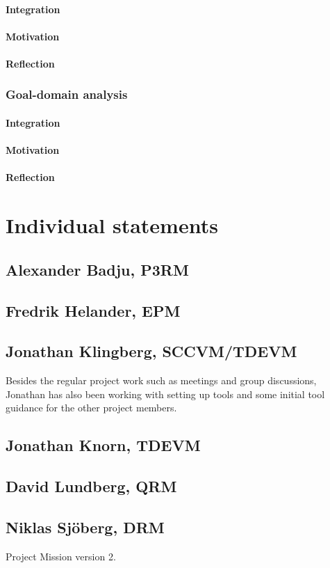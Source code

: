 \documentclass[10pt]{article}
\begin{document}
\paragraph{Integration}
\paragraph{Motivation}
\paragraph{Reflection}


\subsubsection{Goal-domain analysis}
\paragraph{Integration}
\paragraph{Motivation}
\paragraph{Reflection}

\section{Individual statements}
\noindent
\subsection{Alexander Badju, P3RM}
\subsection{Fredrik Helander, EPM}
\subsection{Jonathan Klingberg, SCCVM/TDEVM}
Besides the regular project work such as meetings and group discussions, Jonathan has also been working with setting up tools and some initial tool guidance for the other project members.
\subsection{Jonathan Knorn, TDEVM}
\subsection{David Lundberg, QRM}
\subsection{Niklas Sjöberg, DRM}

\begin{thebibliography}{1}
 Project Mission version 2. 

\end{thebibliography}
\end{document}

